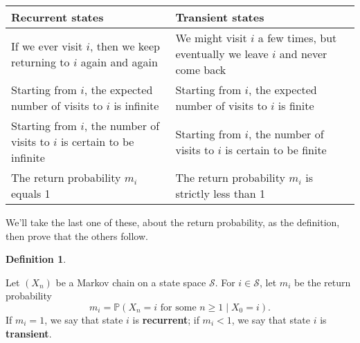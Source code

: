 \documentclass[
  a4paper,
]{article}
\theoremstyle{definition}
\newtheorem{definition}{Definition}[section]
\theoremstyle{definition}
\theoremstyle{definition}
\theoremstyle{remark}
\begin{document}
\begin{longtable}[]{@{}ll@{}}
\toprule
\begin{minipage}[b]{0.47\columnwidth}\raggedright
Recurrent states\strut
\end{minipage} & \begin{minipage}[b]{0.47\columnwidth}\raggedright
Transient states\strut
\end{minipage}\tabularnewline
\midrule
\endhead
\begin{minipage}[t]{0.47\columnwidth}\raggedright
If we ever visit \(i\), then we keep returning to \(i\) again and again\strut
\end{minipage} & \begin{minipage}[t]{0.47\columnwidth}\raggedright
We might visit \(i\) a few times, but eventually we leave \(i\) and never come back\strut
\end{minipage}\tabularnewline
\begin{minipage}[t]{0.47\columnwidth}\raggedright
Starting from \(i\), the expected number of visits to \(i\) is infinite\strut
\end{minipage} & \begin{minipage}[t]{0.47\columnwidth}\raggedright
Starting from \(i\), the expected number of visits to \(i\) is finite\strut
\end{minipage}\tabularnewline
\begin{minipage}[t]{0.47\columnwidth}\raggedright
Starting from \(i\), the number of visits to \(i\) is certain to be infinite\strut
\end{minipage} & \begin{minipage}[t]{0.47\columnwidth}\raggedright
Starting from \(i\), the number of visits to \(i\) is certain to be finite\strut
\end{minipage}\tabularnewline
\begin{minipage}[t]{0.47\columnwidth}\raggedright
The return probability \(m_i\) equals 1\strut
\end{minipage} & \begin{minipage}[t]{0.47\columnwidth}\raggedright
The return probability \(m_i\) is strictly less than 1\strut
\end{minipage}\tabularnewline
\bottomrule
\end{longtable}

We'll take the last one of these, about the return probability, as the definition, then prove that the others follow.

\begin{definition}
\protect\hypertarget{def:unlabeled-div-3}{}\label{def:unlabeled-div-3}

Let \((X_n)\) be a Markov chain on a state space \(\mathcal S\). For \(i \in \mathcal S\), let \(m_i\) be the return probability
\[ m_i = \mathbb P(X_n = i \text{ for some $n \geq 1$} \mid X_0 = i) . \]
If \(m_i = 1\), we say that state \(i\) is \textbf{recurrent}; if \(m_i < 1\), we say that state \(i\) is \textbf{transient}.

\end{definition}
\end{document}

